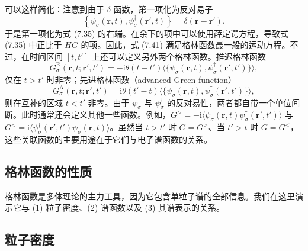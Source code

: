 可以这样简化：注意到由于 $\delta$ 函数，第一项化为反对易子
\begin{equation*}
\left\{\psi_{\sigma}(\mathbf{r},t),\psi_{\sigma}^{\dagger}(\mathbf{r}',t)\right\}=\delta(\mathbf{r}-\mathbf{r}').\tag{7.44}
\end{equation*}
于是第一项化为式 (7.35) 的右端。在余下的项中可以使用薛定谔方程，导致式 (7.35) 中正比于 $HG$ 的项。因此，式 (7.41) 满足格林函数最一般的运动方程。不过，在时间区间 $[t,t']$ 上还可以定义另外两个格林函数。推迟格林函数
\begin{equation*}
G_{\sigma}^{\mathrm{R}}(\mathbf{r},t;\mathbf{r}',t')=-\mathrm{i}\theta(t-t')\big\langle\big\{\psi_{\sigma}(\mathbf{r},t),\psi_{\sigma}^{\dagger}(\mathbf{r}',t')\big\}\big\rangle,\tag{7.45}
\end{equation*}
仅在 $t>t'$ 时非零；先进格林函数（advanced Green function）
\begin{equation*}
G_{\sigma}^{\mathrm{A}}(\mathbf{r},t;\mathbf{r}',t')=\mathrm{i}\theta(t'-t)\big\langle\big\{\psi_{\sigma}(\mathbf{r},t),\psi_{\sigma}^{\dagger}(\mathbf{r}',t')\big\}\big\rangle,\tag{7.46}
\end{equation*}
则在互补的区域 $t<t'$ 非零。由于 $\psi_{\sigma}$ 与 $\psi_{\sigma}^{\dagger}$ 的反对易性，两者都自带一个单位间断。此时通常还会定义其他一些函数。例如，$G^{>}=-\mathrm{i}\langle\psi_{\sigma}(\mathbf{r},t)\psi_{\sigma}^{\dagger}(\mathbf{r}',t')\rangle$ 与 $G^{<}=\mathrm{i}\langle\psi_{\sigma}^{\dagger}(\mathbf{r}',t')\psi_{\sigma}(\mathbf{r},t)\rangle$。虽然当 $t>t'$ 时 $G=G^{>}$、当 $t'>t$ 时 $G=G^{<}$，这些关联函数的主要用途在于它们与电子谱函数的关系。

\subsection{格林函数的性质}

格林函数是多体理论的主力工具，因为它包含单粒子谱的全部信息。我们在这里演示它与 (1) 粒子密度、(2) 谱函数以及 (3) 其谱表示的关系。

\subsection*{粒子密度}


